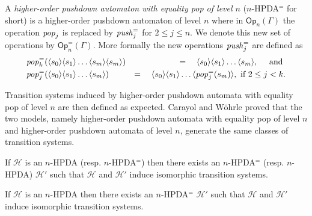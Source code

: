 \documentclass[a4paper,UKenglish,cleveref, autoref, thm-restate]{lipics-v2021}
\renewcommand{\H}{\mathcal{H}}
\newcommand{\Op}{\mathsf{Op}}
\begin{document}
A {\em higher-order pushdown automaton with equality pop of level $n$} ($n$-HPDA$^=$ for short) 
is a higher-order pushdown automaton of level $n$ where in
$\Op_n(\Gamma)$
 the operation 
 $\text{\textit{pop}}_j$  
  is replaced by 
$\text{\textit{push}}_j^=$
for $2 \leq j \leq n$.
We denote
this new set of operations by 
$\Op_n^=(\Gamma)$. 
More formally the new operations $\text{\textit{push}}_j^=$ are defined as
\begin{eqnarray*}
&\text{\textit{pop}}_k^=( \langle s_0 \rangle \langle s_1 \rangle \ldots  \langle s_m \rangle \langle s_m \rangle) &=\quad  \langle s_0 \rangle \langle s_1 \rangle \ldots \langle s_m \rangle , \quad \text{ and }\\
&\text{\textit{pop}}_j^=( \langle s_0 \rangle \langle s_1 \rangle \ldots \langle s_m \rangle) &=\quad \langle s_0 \rangle \langle s_1 \rangle \ldots 
\langle \text{\textit{pop}}_j^=(s_m) \rangle,
\text{ if } 2 \leq j < k. 
\end{eqnarray*}
%
%
%
%

%
Transition systems induced by higher-order pushdown automata with equality pop of level $n$
are then defined as expected.  
Carayol and W\"ohrle proved \cite{Woeh05, carayol2006automates} that the two models,
namely
higher-order pushdown automata with equality pop of level $n$
and
higher-order pushdown automata of level $n$,
generate the same classes of transition systems.





\begin{theorem}{\cite{Woeh05, carayol2006automates}}
If $\H$ is an $n$-HPDA (resp. $n$-HPDA$^=$) then there
exists an $n$-HPDA$^=$ (resp. $n$-HPDA) $\H'$ such that
$\H$ and $\H'$ %
induce isomorphic transition systems.
\end{theorem}

\iffalse
\begin{theorem}{\cite{Woeh05, carayol2006automates}}
If $\H$ is an $n$-HPDA  then there
exists an $n$-HPDA$^=$  $\H'$ such that
$\H$ and $\H'$ %
induce isomorphic transition systems.
\end{theorem}
\end{document}

